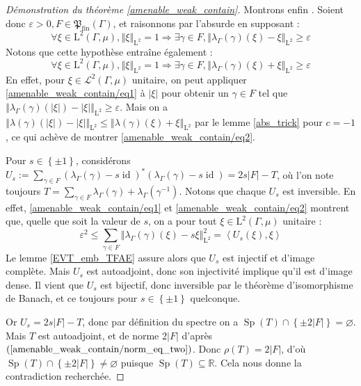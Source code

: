 \documentclass[a4paper,12pt]{article}
\newcommand{\R}{\mathbb{R}}
\newcommand{\norm}[1]{\left\Vert #1\right\Vert}
\newcommand{\abs}[1]{\left\vert#1\right\vert}
\newcommand{\card}[1]{\abs{#1}}
\newcommand{\ket}[1]{\left\langle #1 \right\rangle}
\newcommand{\set}[1]{\left\{ #1 \right\}}
\newcommand{\inv}{^{-1}}
\renewcommand{\implies}{\Rightarrow}
\newcommand{\finparts}{\mathfrak{P}_{\mathrm{fin}}}
\DeclareMathOperator{\id}{id}
\DeclareMathOperator{\Sp}{Sp}
\begin{document}
\begin{proof}[Démonstration du théorème \ref{amenable_weak_contain}]
    Montrons enfin \framebox{$(\ref{amenable_weak_contain/norm_eq_two})\implies(\ref{amenable_weak_contain/weak_almost_invariant})$}. Soient donc $\varepsilon>0, F\in\finparts(\Gamma)$, et 
    raisonnons par l'absurde en supposant :
    \begin{equation}\label{amenable_weak_contain/eq1}
        \forall\xi\in\mathrm{L}^2(\Gamma, \mu), \norm{\xi}_{\mathrm{L}^2} = 1\implies \exists\gamma\in F, \norm{\lambda_\Gamma(\gamma)(\xi) - \xi}_{\mathrm{L}^2}\geq\varepsilon
    \end{equation}
    Notons que cette hypothèse entraîne également :
    \begin{equation}\label{amenable_weak_contain/eq2}
        \forall\xi\in\mathrm{L}^2(\Gamma, \mu), \norm{\xi}_{\mathrm{L}^2} = 1\implies \exists\gamma\in F, \norm{\lambda_\Gamma(\gamma)(\xi) + \xi}_{\mathrm{L}^2}\geq\varepsilon
    \end{equation}
    En effet, pour $\xi\in\mathscr{L}^2(\Gamma, \mu)$ unitaire, on peut appliquer \eqref{amenable_weak_contain/eq1} à $\abs\xi$ pour obtenir un $\gamma\in F$ tel que $\norm{\lambda_\Gamma(\gamma)(\abs\xi) - \abs\xi}_{\mathrm{L}^2}\geq\varepsilon$.
    Mais on a $\norm{\lambda(\gamma)(\abs{\xi}) - \abs{\xi}}_{\mathrm{L}^2} \le \norm{\lambda(\gamma)(\xi) + \xi}_{\mathrm{L}^2}$ par le lemme \ref{abs_trick} pour $c = -1$, ce qui achève de montrer \eqref{amenable_weak_contain/eq2}.

    Pour $s\in\set{\pm1}$, considérons $U_s := \sum_{\gamma\in F}(\lambda_\Gamma(\gamma) - s\id)^*(\lambda_\Gamma(\gamma) - s\id) = 2s\card{F} - T$, 
    où l'on note toujours $T = \sum_{\gamma\in F}\lambda_\Gamma(\gamma) + \lambda_\Gamma(\gamma\inv)$. Notons que chaque $U_s$ est inversible. 
    En effet, \eqref{amenable_weak_contain/eq1} et \eqref{amenable_weak_contain/eq2} montrent que, quelle que soit la valeur de $s$, 
    on a pour tout $\xi\in\mathrm{L}^2(\Gamma, \mu)$ unitaire :
    \begin{equation*}
        \varepsilon^2\leq\sum_{\gamma\in F}\norm{\lambda_\Gamma(\gamma)(\xi) - s\xi}_{\mathrm{L}^2}^2 = \ket{U_s(\xi), \xi}
    \end{equation*}
    Le lemme \ref{EVT_emb_TFAE} assure alors que $U_s$ est injectif et d'image complète. Mais $U_s$ est autoadjoint, donc 
    son injectivité implique qu'il est d'image dense. Il vient que $U_s$ est bijectif, donc inversible par le théorème d'isomorphisme de Banach,
    et ce toujours pour $s\in\set{\pm1}$ quelconque.

    Or $U_s = 2s\card{F} - T$, donc par définition du spectre on a $\Sp(T)\cap\set{\pm2\card{F}}=\varnothing$. Mais $T$ est autoadjoint,
    et de norme $2\card{F}$ d'après $(\ref{amenable_weak_contain/norm_eq_two})$. Donc $\rho(T) = 2\card{F}$, d'où $\Sp(T)\cap\set{\pm2\card{F}}\neq\varnothing$
    puisque $\Sp(T)\subseteq\R$. Cela nous donne la contradiction recherchée.


\end{proof}
\end{document}

